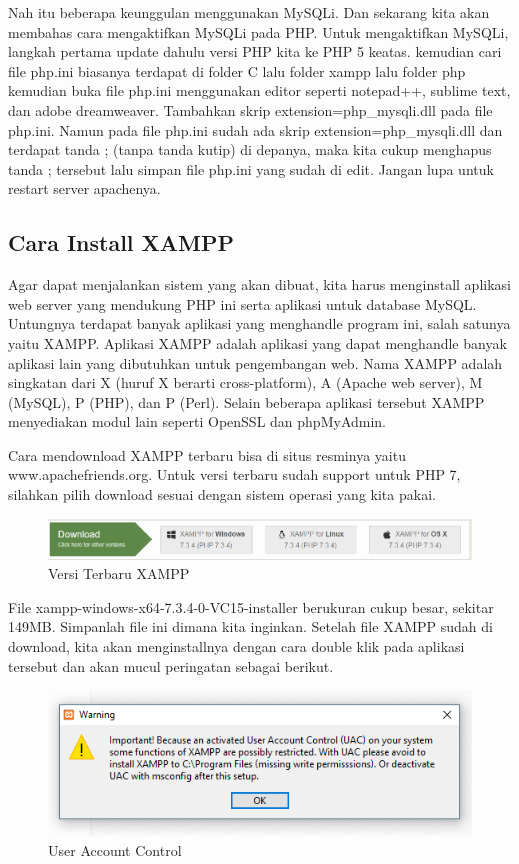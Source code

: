 Nah itu beberapa keunggulan menggunakan MySQLi. Dan sekarang kita akan membahas cara mengaktifkan MySQLi pada PHP.
Untuk mengaktifkan MySQLi, langkah pertama update dahulu versi PHP kita ke PHP 5 keatas. kemudian cari file php.ini biasanya terdapat di folder C lalu folder xampp lalu folder php kemudian buka file php.ini menggunakan editor seperti notepad++, sublime text, dan adobe dreamweaver. Tambahkan skrip extension=php\_mysqli.dll pada file php.ini. Namun pada file php.ini sudah ada skrip extension=php\_mysqli.dll dan terdapat tanda ; (tanpa tanda kutip) di depanya, maka kita cukup menghapus tanda ; tersebut lalu simpan file php.ini yang sudah di edit. Jangan lupa untuk restart server apachenya.

\subsection{Cara Install XAMPP}
Agar dapat menjalankan sistem yang akan dibuat, kita harus menginstall aplikasi web server yang mendukung PHP ini serta aplikasi untuk database MySQL. Untungnya terdapat banyak aplikasi yang menghandle program ini, salah satunya yaitu XAMPP. Aplikasi XAMPP adalah aplikasi yang dapat menghandle banyak aplikasi lain yang dibutuhkan untuk pengembangan web. Nama XAMPP adalah singkatan dari X (huruf X berarti cross-platform), A (Apache web server), M (MySQL), P (PHP), dan P (Perl). Selain beberapa aplikasi tersebut XAMPP menyediakan modul lain seperti OpenSSL dan phpMyAdmin.
\par
Cara mendownload XAMPP terbaru bisa di situs resminya yaitu www.apachefriends.org. Untuk versi terbaru sudah support untuk PHP 7, silahkan pilih download sesuai dengan sistem operasi yang kita pakai.

\begin{figure}[h]
\centering
\includegraphics[scale=0.5]{figures/xampp}
\caption{Versi Terbaru XAMPP}
\end{figure}

File xampp-windows-x64-7.3.4-0-VC15-installer berukuran cukup besar, sekitar 149MB. Simpanlah file ini dimana kita inginkan.
Setelah file XAMPP sudah di download, kita akan menginstallnya dengan cara double klik pada aplikasi tersebut dan akan mucul peringatan sebagai berikut.

 \begin{figure}[h]
\centering
\includegraphics[scale=0.5]{figures/uac}
\caption{User Account Control}
\end{figure}

